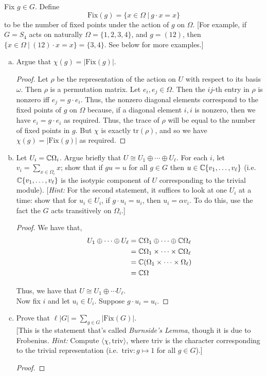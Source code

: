 \documentclass[11pt, reqno]{amsart}
\theoremstyle{plain}
\theoremstyle{definition}
\theoremstyle{example}
\def\<{\langle} \def\>{\rangle}
\def\tr{\mathrm{tr}}
\def\Fix{\mathrm{Fix}}
\def\triv{\mathrm{triv}}
\begin{document}
\begin{enumerate}[I ]
\begin{enumerate}[1.]
Fix $g \in G$. Define 
$$\Fix(g) = \{ x \in \Omega ~|~ g \cdot x = x\} $$
to be the number of fixed points under the action of $g$ on $\Omega$.  {[For example, if $G = S_4$ acts on naturally $\Omega = \{1,2,3, 4\}$, and $g = (12)$, then $\{ x \in \Omega ~|~ (12) \cdot x = x\} = \{3, 4\}$. See below for more examples.]} 
\begin{enumerate}[(a)]
\item Argue that $\chi(g) = |\Fix(g)|$.
\begin{proof}
Let $\rho$ be the representation of the action on $U$ with respect to its basis $\omega$. Then $\rho$ is a permutation matrix. Let $e_i, e_j \in \Omega$. Then the $ij$-th entry in $\rho$ is nonzero iff $e_j=g \cdot e_i$. Thus, the nonzero diagonal elements correspond to the fixed points of $g$ on $\Omega$ because, if a diagonal element $i, i$ is nonzero, then we have $e_i = g \cdot e_i$ as required. Thus, the trace of $\rho$ will be equal to the number of fixed points in $g$. But $\chi$ is exactly $\tr(\rho)$, and so we have $\chi(g) = |\Fix(g)|$ as required.
\end{proof}
\item Let $U_i = \mathbb{C} \Omega_i$. Argue briefly that $U \cong U_1 \oplus \cdots \oplus U_\ell$. For each $i$, let $v_i = \sum_{x \in \Omega_i} x$; show that if $gu = u$ for all $g \in G$ then $u \in \mathbb{C}\{v_1, \dots, v_\ell\}$ (i.e.\ $\mathbb{C}\{v_1, \dots, v_\ell\}$ is the isotypic component of $U$ corresponding to the trivial module). 
{[\emph{Hint:} For the second statement, it suffices to look at one $U_i$ at a time: show that for $u_i \in U_i$,  if $g \cdot u_i = u_i$, then $u_i = \alpha v_i$. To do this, use the fact the $G$ acts transitively on $\Omega_i$.]}
\begin{proof}
We have that,
\begin{align*}
U_1 \oplus \cdots \oplus U_{\ell} &= \mathbb{C} \Omega_1 \oplus \cdots \oplus \mathbb{C} \Omega_{\ell}\\
&= \mathbb{C} \Omega_1 \times \cdots \times \mathbb{C} \Omega_{\ell}\\
&= \mathbb{C} (\Omega_1 \times \cdots \times \Omega_{\ell})\\
&= \mathbb{C} \Omega
\end{align*}

Thus, we have that $U \cong U_1 \oplus \cdots U_{\ell}$.\\

Now fix $i$ and let $u_i \in U_i$. Suppose $g \cdot u_i = u_i$.
\end{proof}
\item Prove that $\ell|G| = \sum_{g \in G} |\Fix(G)|$.\\
{[This is the statement that's called \emph{Burnside's Lemma}, though it is due to Frobenius. \emph{Hint:} Compute $\<\chi, \triv\>$, where $\triv$ is the character corresponding to the trivial representation (i.e.\ $\triv: g \mapsto 1$ for all $g \in G$).]} 
\begin{proof}


\end{proof}
\end{enumerate}
\end{enumerate}
\end{enumerate}
\end{document}
